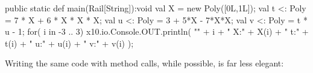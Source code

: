 \begin{xten}
  public static def main(Rail[String]):void {
     val X = new Poly([0L,1L]);
     val t <: Poly = 7 * X + 6 * X * X * X; 
     val u <: Poly = 3 + 5*X - 7*X*X;
     val v <: Poly = t * u - 1;
     for( i in -3 .. 3) {
       x10.io.Console.OUT.println(
         "" + i + "	X:" + X(i) + "	t:" + t(i) 
         + "	u:" + u(i) + "	v:" + v(i)
         );
     }
  }

\end{xten}

Writing the same code with method calls, while possible, is far less elegant: 

%
%
%
%
%
%
%
%

